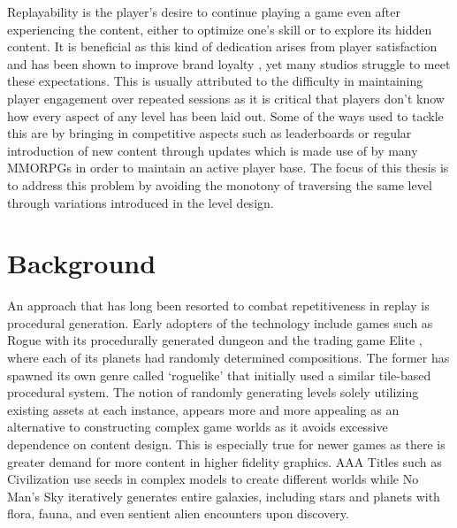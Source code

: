 \documentclass{Configuration_Files/PoliMi3i_thesis}
\begin{document}
Replayability is the player’s desire to continue playing a game even after 
experiencing the content, either to optimize one’s skill or to explore its hidden 
content. It is beneficial as this kind of dedication arises from player satisfaction and 
has been shown to improve brand loyalty \cite{TiF11}, yet many studios struggle to meet these 
expectations. This is usually attributed to the difficulty in maintaining player 
engagement over repeated sessions as it is critical that players don't know how every 
aspect of any level has been laid out. Some of the ways used to tackle this are by 
bringing in competitive aspects such as leaderboards or regular introduction of new 
content through updates which is made use of by many MMORPGs in order to 
maintain an active player base. The focus of this thesis is to address this problem by 
avoiding the monotony of traversing the same level through variations introduced in 
the level design.
\newpage
\section{Background}
\label{sec:background}
An approach that has long been resorted to combat repetitiveness in replay is 
procedural generation. Early adopters of the technology include games such as 
Rogue \cite{MiT80} with its procedurally generated dungeon and the trading game Elite \cite{DaB84}, 
where each of its planets had randomly determined compositions. The former has 
spawned its own genre called ‘roguelike’ that initially used a similar tile-based 
procedural system. The notion of randomly generating levels solely utilizing existing 
assets at each instance, appears more and more appealing as an alternative to 
constructing complex game worlds as it avoids excessive dependence on content 
design. This is especially true for newer games as there is greater demand for more 
content in higher fidelity graphics. AAA Titles such as Civilization \cite{MiP96} use seeds in 
complex models to create different worlds while No Man’s Sky \cite{HaG16} iteratively 
generates entire galaxies, including stars and planets with flora, fauna, and even 
sentient alien encounters upon discovery.
\end{document}
